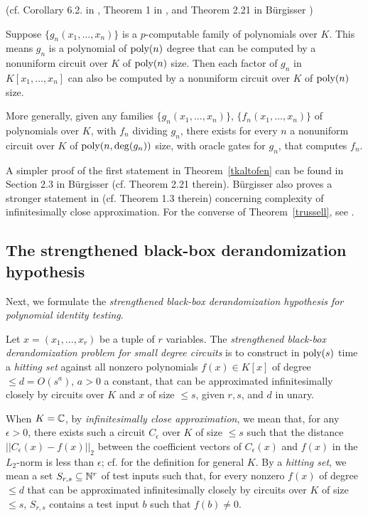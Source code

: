 \documentclass[11pt]{article}
\begin{document}
\begin{theorem} (cf. Corollary 6.2. in \cite{kaltofen},  Theorem 1 in \cite{kaltofen2}, and Theorem 2.21 in B\"urgisser \cite{burgbook})

\label{tkaltofen}

Suppose $\{g_n(x_1,\ldots,x_n)\}$ is a $p$-computable family \cite{valiant2} 
of polynomials over $K$. This means
$g_n$ is a polynomial of ${\mbox {poly}}(n)$ degree that can be computed by a 
nonuniform circuit over $K$ of ${\mbox {poly}}(n)$ size. 
Then each factor  of $g_n$ in  $K[x_1,\ldots,x_n]$  
can also be computed by a 
nonuniform circuit over $K$ of ${\mbox {poly}}(n)$ size. 

More generally, given any families $\{g_n(x_1,\ldots,x_n)\}$,
$\{f_n(x_1,\ldots,x_n)\}$ of polynomials over $K$, 
with  $f_n$ dividing $g_n$, 
there exists for every $n$  a nonuniform circuit over $K$ of 
${\mbox {poly}}(n,\deg(g_n))$ size, with oracle gates for $g_n$, that computes $f_n$. 
\end{theorem}

A simpler 
proof of the first statement in Theorem~\ref{tkaltofen}   can be found in Section 2.3 in
B\"urgisser \cite{burgbook} (cf. Theorem 2.21 therein). 
B\"urgisser also proves a stronger statement in \cite{burg2} (cf. Theorem 1.3 therein)
concerning   complexity of  infinitesimally close approximation.
For the  converse of  Theorem~\ref{trussell},  see \cite{schnorr,agrawal}.


\subsection{The strengthened black-box derandomization hypothesis} \label{sstrongblack}
Next,  we formulate the {\em strengthened   black-box derandomization hypothesis   for polynomial identity testing}.

Let  $x=(x_1,\ldots,x_r)$ be a tuple of $r$ variables.
The {\em strengthened black-box derandomization problem for small degree circuits} is to construct in ${\mbox {poly}}(s)$ time 
a {\em  hitting set}  against all nonzero polynomials $f(x) \in K[x]$ of degree $\le d=O(s^a)$, $a>0$ a constant, 
that can be approximated infinitesimally  closely  by   circuits over $K$ and $x$  of size $\le s$,
given $r,s$, and $d$ in unary.


When $K=\mathbb{C}$, by {\em infinitesimally close approximation}, we mean that,  for any $\epsilon >0$, there exists such a circuit 
$C_\epsilon$ over $K$  of size $\le s$ such that the distance $||C_\epsilon(x)-f(x)||_2$ between the coefficient vectors of 
$C_\epsilon(x)$ and 
$f(x)$ in the $L_2$-norm  is less than $\epsilon$; cf. \cite{burg2} for the definition for general $K$.
By a {\em hitting set},  we mean a set $S_{r,s} \subseteq \mathbb{N}^r$  of test inputs
such that,  for every nonzero $f(x)$ of  degree $\le d$  that can be approximated
infinitesimally closely by circuits over $K$ of size $\le s$,
$S_{r,s}$ contains a test input $b$ such that $f(b)\not =0$.
\end{document}
